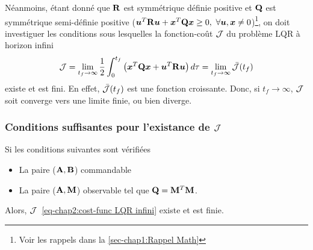Néanmoins, étant donné que $\mathbf{R}$ est symmétrique définie positive et $\mathbf{Q}$ est symmétrique semi-définie positive ($ \bm{u}^T\mathbf{R}\bm{u}+\bm{x}^T\mathbf{Q}\bm{x}\geq0, \ \forall \bm{u},\bm{x}\neq0$)\footnote{Voir les rappels dans la \cref{sec-chap1:Rappel Math}},  on doit investiguer les conditions sous lesquelles la fonction-coût ${\cal J}$ du problème LQR à horizon infini
\begin{equation}\label{eq-chap2:cost-func LQR infini}
{\cal J} = \lim\limits_{t_f\rightarrow\infty}\frac{1}{2}\int_{0}^{t_f}\left(\bm{x}^T\mathbf{Q}\bm{x} + \bm{u}^T\mathbf{R}\bm{u}\right) d\tau = \lim\limits_{t_f\rightarrow\infty}\bar{\cal J}(t_f)
\end{equation} 
existe et est fini. En effet, $\bar{\cal J}(t_f)$ est une fonction croissante. Donc, si $t_f\rightarrow\infty$, ${\cal J}$ soit converge vers une limite finie, ou bien diverge. 
\subsubsection{Conditions suffisantes pour l'existance de ${\cal J}$}
Si les conditions suivantes sont vérifiées
\begin{itemize}
	\item La paire ($\mathbf{A},\mathbf{B}$) commandable
	\item La paire ($\mathbf{A},\mathbf{M}$) observable tel que $\mathbf{Q}=\mathbf{M}^T\mathbf{M}$.
\end{itemize}
Alors, ${\cal J}$~\eqref{eq-chap2:cost-func LQR infini} existe et est finie.
